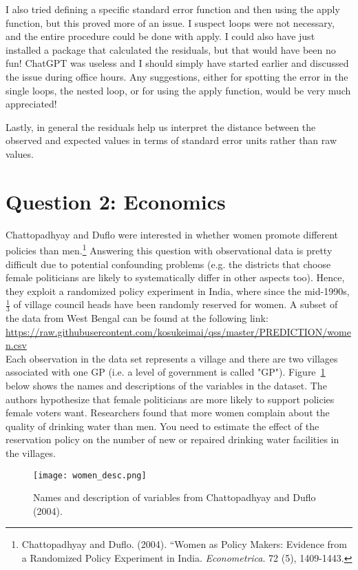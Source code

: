 \documentclass[12pt,letterpaper]{article}
\begin{document}
\begin{enumerate}
 	  
 	
 	I also tried defining a specific standard error function and then using the apply function, but this proved more of an issue. I suspect loops were not necessary, and the entire procedure could be done with apply.  I could also have just installed a package that calculated the residuals, but that would have been no fun! ChatGPT was useless and I should simply have started earlier and discussed the issue during office hours. Any suggestions, either for spotting the error in the single loops, the nested loop, or for using the apply function, would be very much appreciated! 
 	
 	Lastly, in general the residuals help us interpret the distance between the observed and expected values in terms of standard error units rather than raw values.
 	 	
 			
\end{enumerate}
\newpage

\section*{Question 2: Economics}
Chattopadhyay and Duflo were interested in whether women promote different policies than men.\footnote{Chattopadhyay and Duflo. (2004). ``Women as Policy Makers: Evidence from a Randomized Policy Experiment in India. \textit{Econometrica}. 72 (5), 1409-1443.} Answering this question with observational data is pretty difficult due to potential confounding problems (e.g. the districts that choose female politicians are likely to systematically differ in other aspects too). Hence, they exploit a randomized policy experiment in India, where since the mid-1990s, $\frac{1}{3}$ of village council heads have been randomly reserved for women. A subset of the data from West Bengal can be found at the following link: \url{https://raw.githubusercontent.com/kosukeimai/qss/master/PREDICTION/women.csv}\\

\noindent Each observation in the data set represents a village and there are two villages associated with one GP (i.e. a level of government is called "GP"). Figure~\ref{fig:women_desc} below shows the names and descriptions of the variables in the dataset. The authors hypothesize that female politicians are more likely to support policies female voters want. Researchers found that more women complain about the quality of drinking water than men. You need to estimate the effect of the reservation policy on the number of new or repaired drinking water facilities in the villages.
\vspace{.5cm}
\begin{figure}[h!]
	\caption{\footnotesize{Names and description of variables from Chattopadhyay and Duflo (2004).}}
	\vspace{.5cm}
	\centering
	\label{fig:women_desc}
	\texttt{[image: women\_desc.png]}
\end{figure}		
\end{document}
